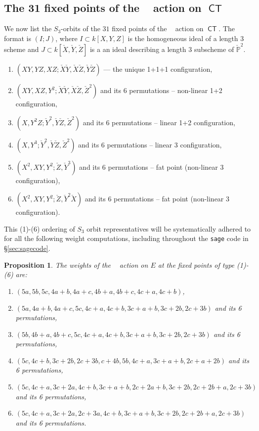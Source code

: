 \documentclass[reqno, 11pt]{amsart}
\theoremstyle{plain}
\newtheorem{proposition}[theorem]{Proposition}
\theoremstyle{remark}
\renewcommand{\P}{\mathbb{P}}
\DeclareMathOperator{\CT}{\mathsf{CT}}
\DeclareMathOperator{\Gm}{\mathbb{G}_{m}}
\begin{document}
\subsection{The 31 fixed points of the $\Gm$ action on $\CT$}
We now list the $S_3$-orbits of the $31$ fixed points of the $\Gm$ action on
$\CT$.  The format is $(I; J)$, where $I \subset k[X,Y,Z]$ is the homogeneous ideal
of a length 3 scheme and $J \subset k[\check{X},\check{Y},\check{Z}]$ is a an ideal describing a length $3$ subscheme of $\check{\P}^{2}$.
\begin{enumerate}
\item $(XY, YZ, XZ; \check{X} \check{Y},\check{X} \check{Z},\check{Y} \check{Z})$ --- the unique 1+1+1 configuration,
\item $(XY, XZ, Y^2; \check{X}\check{Y}, \check{X}\check{Z}, \check{Z}^2)$ and its 6 permutations -- non-linear 1+2 configuration,
\item $(X, Y^2Z; \check{Y}^2 ,\check{Y}\check{Z} , \check{Z}^2)$ and its 6 permutations -- linear 1+2 configuration, 
\item $(X, Y^3; \check{Y}^2 ,\check{Y}\check{Z} , \check{Z}^2)$ and its 6 permutations -- linear 3 configuration,
\item $(X^2, XY, Y^2; \check{Z}, \check{Y}^{3})$ and its 6 permutations -- fat point (non-linear 3 configuration),
\item $(X^2, XY, Y^2; \check{Z}, \check{Y}^{2}\check{X})$ and its 6 permutations -- fat point (non-linear 3 configuration).
\end{enumerate}

This (1)-(6) ordering of $S_3$ orbit representatives will be systematically adhered to for all the following weight computations, including throughout the \texttt{sage} code in \S \ref{sec:sagecode}.

\begin{proposition}
The weights of the $\Gm$ action on $E$ at the fixed points of type (1)-(6) are:
\begin{enumerate}
\item $(5a, 5b, 5c, 4a+b, 4a+c, 4b+a, 4b+c, 4c+a, 4c+b)$,
\item $(5a, 4a+b, 4a+c, 5c, 4c+a, 4c+b, 3c+a+b, 3c+2b, 2c+3b)$ and its 6 permutations,
\item $(5b, 4b+a, 4b+c, 5c, 4c+a, 4c+b, 3c+a+b, 3c+2b, 2c+3b)$ and its 6 permutations,
\item $(5c, 4c+b, 3c+2b, 2c+3b, c+4b, 5b, 4c+a, 3c+a+b, 2c+a+2b)$ and its 6 permutations,
\item $(5c, 4c+a, 3c+2a, 4c+b, 3c+a+b, 2c+2a+b, 3c+2b, 2c+2b+a, 2c+3b)$ and its 6 permutations,
\item $(5c, 4c+a, 3c+2a, 2c+3a, 4c+b, 3c+a+b, 3c+2b, 2c+2b+a, 2c+3b)$ and its 6 permutations.
\end{enumerate}
\end{proposition}
\end{document}

